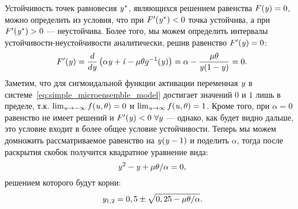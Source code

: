 Устойчивость точек равновесия $\mathit{y}^{*}$, являющихся решением равенства $F(\mathit{y}) = 0$, можно определить из условия, что при $F^{\prime}(\mathit{y}^{*}) < 0$ точка устойчива, а при $F^{\prime}(\mathit{y}^{*}) > 0$ --- неустойчива. Более того, мы можем определить интервалы устойчивости-неустойчивости аналитически, решив равенство $F^{\prime}(\mathit{y}) = 0$:
\begin{equation}
    \nonumber
    F^{\prime}(\mathit{y}) 
    = \dfrac{d}{d\mathit{y}}\left( \alpha \mathit{y} + \mathit{i} - \mu \theta g^{-1}(\mathit{y}) \right) 
    = \alpha - \dfrac{\mu \theta}{\mathit{y}(1 - \mathit{y})}
    = 0.
\end{equation}
Заметим, что для сигмоидальной функции активации переменная $\mathit{y}$ в системе~\eqref{eq:simple_microensemble_model} достигает значений $0$ и $1$ лишь в пределе, т.к. $\lim_{\mathit{u} \to -\infty} f(\mathit{u}, \theta) = 0$ и $\lim_{\mathit{u} \to \infty} f(\mathit{u}, \theta) = 1$. Кроме того, при $\alpha = 0$ равенство не имеет решений и $F^{\prime}(\mathit{y}) < 0\ \forall y$ --- однако, как будет видно дальше, это условие входит в более общее условие устойчивости. Теперь мы можем домножить рассматриваемое равенство на $\mathit{y}(\mathit{y} - 1)$ и поделить $\alpha$, тогда после раскрытия скобок получится квадратное уравнение вида:
\begin{equation}
    \nonumber
    \mathit{y}^{2} - \mathit{y} + \mu \theta / \alpha = 0,
\end{equation}
решением которого будут корни:
\begin{equation}
    \label{eq:sigm_stability_bounds_y}
    \mathit{y}_{1,2} = 0,5 \pm \sqrt{0,25 - \mu \theta / \alpha}.
\end{equation}

